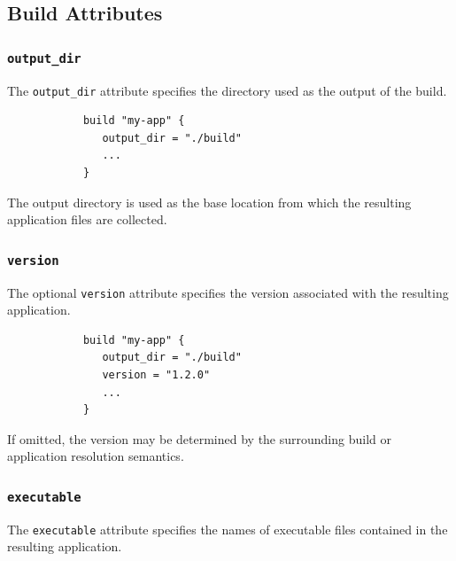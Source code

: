 \documentclass[11pt,a4paper]{article}
\begin{document}
    \subsection{Build Attributes}\label{subsec:build-attributes}

    \subsubsection{\texttt{output\_dir}}

    The \texttt{output\_dir} attribute specifies the directory used as the output of the build.

    \begin{center}
        \begin{verbatim}
            build "my-app" {
               output_dir = "./build"
               ...
            }
        \end{verbatim}
    \end{center}

    The output directory is used as the base location from which the resulting application files are collected.

    \subsubsection{\texttt{version}}

    The optional \texttt{version} attribute specifies the version associated with the resulting application.

    \begin{center}
        \begin{verbatim}
            build "my-app" {
               output_dir = "./build"
               version = "1.2.0"
               ...
            }
        \end{verbatim}
    \end{center}

    If omitted, the version may be determined by the surrounding build or application resolution semantics.

    \subsubsection{\texttt{executable}}

    The \texttt{executable} attribute specifies the names of executable files contained in the resulting application.
\end{document}

